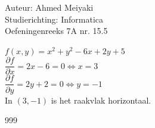 \documentclass[a4paper]{article}
\begin{document}
  
\noindent \large Auteur: Ahmed Meiyaki \\
\noindent \large Studierichting: Informatica\\
\noindent \large Oefeningenreeks 7A nr. 15.5\\

\medskip


\normalsize

$f(x,y) = x^2 + y^2 -6x + 2y + 5$\\

$\dfrac{\partial f}{\partial x} = 2x - 6 = 0 \Leftrightarrow x = 3 $\\

$\dfrac{\partial f}{\partial y} = 2y + 2 = 0 \Leftrightarrow y = -1 $\\

In $(3,-1)$ is het raakvlak horizontaal.








\begin{thebibliography}{999}
\end{thebibliography}
\end{document}

